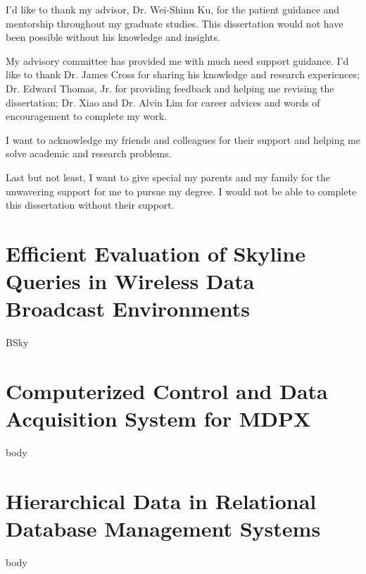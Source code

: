 \documentclass[12pt]{report}
\begin{document}
\begin{romanpages}
\begin{acknowledgments}
I'd like to thank my advisor, Dr. Wei-Shinn Ku, for the patient guidance and mentorship throughout my graduate studies. This dissertation would not have been possible without his knowledge and insights.

My advisory committee has provided me with much need support guidance. I'd like to thank Dr. James Cross for sharing his knowledge and research experiences; Dr. Edward Thomas, Jr. for providing feedback and helping me revising the dissertation; Dr. Xiao and Dr. Alvin Lim for career advices and words of encouragement to complete my work.

I want to acknowledge my friends and colleagues for their support and helping me solve academic and research problems.

Last but not least, I want to give special my parents and my family for the unwavering support for me to pursue my degree. I would not be able to complete this dissertation without their support.
\end{acknowledgments}

\tableofcontents
\listoffigures
\listoftables
\end{romanpages}        %



\chapter{Efficient Evaluation of Skyline Queries in Wireless Data Broadcast Environments}
{BSky}

\chapter{Computerized Control and Data Acquisition System for MDPX}
{body}

\chapter{Hierarchical Data in Relational Database Management Systems}
{body}

\end{document}
